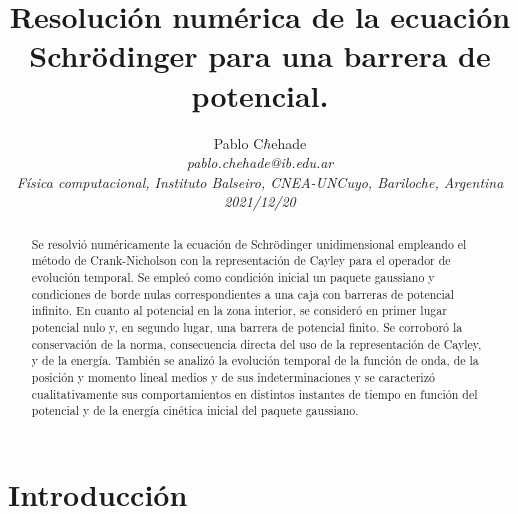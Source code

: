 \documentclass[aps,prb,twocolumn,superscriptaddress,floatfix,longbibliography]{revtex4-2}
\newcounter{para}
\begin{document}
\newcommand{\mytitle}{Resolución numérica de la ecuación Schrödinger para una barrera de potencial.}

\title{\mytitle}

\author{Pablo C$\mathrm{\hbar}$ehade \\
    \small \textit{pablo.chehade@ib.edu.ar} \\
    \small \textit{Física computacional, Instituto Balseiro, CNEA-UNCuyo, Bariloche, Argentina} \\
    \small \textit{2021/12/20}}


\begin{abstract}

Se resolvió numéricamente la ecuación de Schrödinger unidimensional empleando el método de Crank-Nicholson con la representación de Cayley para el operador de evolución temporal. Se empleó como condición inicial un paquete gaussiano y condiciones de borde nulas correspondientes a una caja con barreras de potencial infinito. En cuanto al potencial en la zona interior, se consideró en primer lugar potencial nulo y, en segundo lugar, una barrera de potencial finito. Se corroboró la conservación de la norma, consecuencia directa del uso de la representación de Cayley, y de la energía. También se analizó la evolución temporal de la función de onda, de la posición y momento lineal medios y de sus indeterminaciones y se caracterizó cualitativamente sus comportamientos en distintos instantes de tiempo en función del potencial y de la energía cinética inicial del paquete gaussiano.

\end{abstract}

\maketitle


\section{Introducción}

\end{document}
